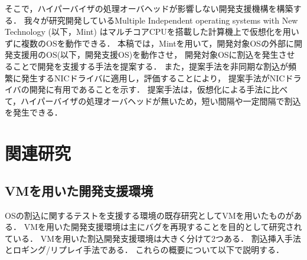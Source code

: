 \documentclass[submit,techreq,noauthor,dvipdfmx]{ipsj}
\begin{document}
そこで，ハイパーバイザの処理オーバヘッドが影響しない開発支援機構を構築する．
我々が研究開発しているMultiple Independent operating systems with New Technology (以下，Mint)\cite{senzaki}
はマルチコアCPUを搭載した計算機上で仮想化を用いずに複数のOSを動作できる．
本稿では，Mintを用いて，開発対象OSの外部に開発支援用のOS(以下，開発支援OS)を動作させ，
開発対象OSに割込を発生させることで開発を支援する手法を提案する．
また，提案手法を非同期な割込が頻繁に発生するNICドライバに適用し，評価することにより，
提案手法がNICドライバの開発に有用であることを示す．
提案手法は，仮想化による手法に比べて，ハイパーバイザの処理オーバヘッドが無いため，短い間隔や一定間隔で割込を発生できる．


\section{関連研究}\label{chap:related_reserch}

\subsection{VMを用いた開発支援環境}\label{sec:debugging_support_mechanism_with_VM}

OSの割込に関するテストを支援する環境の既存研究としてVMを用いたものがある．
VMを用いた開発支援環境は主にバグを再現することを目的として研究されている．
VMを用いた割込開発支援環境は大きく分けて2つある．
割込挿入手法\cite{miyahara}とロギング/リプレイ手法\cite{samuel}\cite{jim}\cite{kawasaki}\cite{li2013lore}である．
これらの概要について以下で説明する．
\end{document}
